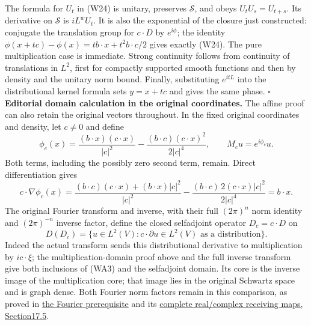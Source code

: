 \documentclass[
  11pt,
]{article}
\begin{document}
The formula for \(U_t\) in (W24) is unitary, preserves \(\mathcal S\),
and obeys \(U_tU_s=U_{t+s}\). Its derivative on \(\mathcal S\) is
\(iL^wU_t\). It is also the exponential of the closure just constructed:
conjugate the translation group for \(c\cdot D\) by \(e^{i\phi}\); the
identity \(\phi(x+tc)-\phi(x)=t b\cdot x+t^2b\cdot c/2\) gives exactly
(W24). The pure multiplication case is immediate. Strong continuity
follows from continuity of translations in \(L^2\), first for compactly
supported smooth functions and then by density and the unitary norm
bound. Finally, substituting \(e^{itL}\) into the distributional kernel
formula sets \(y=x+tc\) and gives the same phase. \(\square\) \textbf{Editorial
domain calculation in the original coordinates.} The affine proof can
also retain the original vectors throughout. In the fixed original
coordinates and density, let \(c\ne0\) and define \[
 \phi_c(x)=\frac{(b\cdot x)(c\cdot x)}{|c|^2}
       -\frac{(b\cdot c)(c\cdot x)^2}{2|c|^4},\qquad
 M_cu=e^{i\phi_c}u.
 \tag{WA1}
\] Both terms, including the possibly zero second term, remain. Direct
differentiation gives \[
 c\cdot\nabla\phi_c(x)=
 \frac{(b\cdot c)(c\cdot x)+(b\cdot x)|c|^2}{|c|^2}
 -\frac{(b\cdot c)\,2(c\cdot x)|c|^2}{2|c|^4}=b\cdot x.
 \tag{WA2}
\] The original Fourier transform and inverse, with their full
\((2\pi)^n\) norm identity and \((2\pi)^{-n}\) inverse factor, define
the closed selfadjoint operator \(D_c=c\cdot D\) on \[
 D(D_c)=\{u\in L^2(V):c\cdot\partial u\in L^2(V)
                         \text{ as a distribution}\}.
 \tag{WA3}
\] Indeed the actual transform sends this distributional derivative to
multiplication by \(ic\cdot\xi\); the multiplication-domain proof above
and the full inverse transform give both inclusions of (WA3) and the
selfadjoint domain. Its core is the inverse image of the multiplication
core; that image lies in the original Schwartz space and is graph dense.
Both Fourier norm factors remain in this comparison, as proved in
\href{prerequisite-bridges.pdf}{the Fourier prerequisite} and its
\href{banach-foundation-bridges.pdf\#section*.160}{complete
real/complex receiving maps, Section17.5}.
\end{document}

